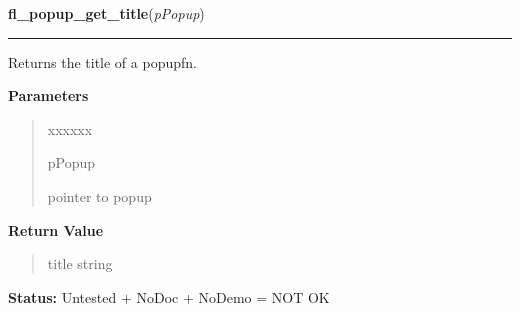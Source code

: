 \hspace{.8\funcindent}\begin{boxedminipage}{\funcwidth}

    \raggedright \textbf{fl\_popup\_get\_title}(\textit{pPopup})

    \vspace{-1.5ex}

    \rule{\textwidth}{0.5\fboxrule}
\setlength{\parskip}{2ex}
    Returns the title of a popupfn.

\setlength{\parskip}{1ex}
      \textbf{Parameters}
      \vspace{-1ex}

      \begin{quote}
        \begin{Ventry}{xxxxxx}

          \item[pPopup]

          pointer to popup

        \end{Ventry}

      \end{quote}

      \textbf{Return Value}
    \vspace{-1ex}

      \begin{quote}
      title string

      \end{quote}

\textbf{Status:} Untested + NoDoc + NoDemo = NOT OK



    \end{boxedminipage}

    \label{xformslib:flpopup:fl_popup_set_title}

    \vspace{0.5ex}

